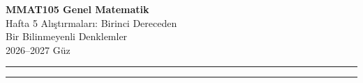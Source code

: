 \documentclass[11pt,a4paper]{article}
\newcounter{alis}
\begin{document}
\begin{minipage}[c]{\textwidth}
{\LARGE\bfseries\color{anamavi} MMAT105 Genel Matematik}\\[4pt]
{\large Hafta 5 Alıştırmaları: Birinci Dereceden\\ Bir Bilinmeyenli Denklemler}\\[6pt]
{\small 2026--2027 Güz}
\end{minipage}

\vspace{4pt}\noindent\textcolor{anamavi}{\rule{\textwidth}{1pt}}



\vspace{6pt}
\noindent\textcolor{anamavi}{\rule{\textwidth}{0.5pt}}\\
{\small }
\end{document}
